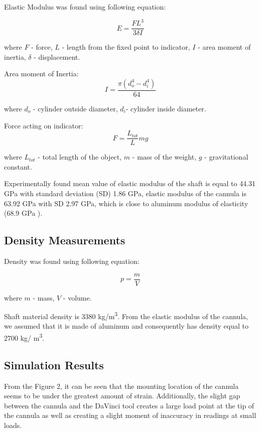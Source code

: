 Elastic Modulus was found using following equation:

\begin{equation}
E = \frac{FL^3}{3 \delta I} 
\end{equation}

where $F$ - force, $L$ - length from the fixed point to indicator, $I$ - area moment of inertia, $\delta$ - displacement.

Area moment of Inertia: 
\begin{equation}
I = \frac{\pi (d_o^4 - d_i^4)}{64}
\end{equation}

where $d_o$ - cylinder outside diameter, $d_i$- cylinder inside diameter.

Force acting on indicator:
\begin{equation}
F = \frac{L_{tot}}{L}mg
\end{equation}

where $L_{tot}$ - total length of the object, $m$ - mass of the weight, $g$ - gravitational constant.

Experimentally found mean value of elastic modulus of the shaft is equal to 44.31 GPa with standard deviation (SD) 1.86 GPa, elastic modulus of the cannula is 63.92 GPa with SD 2.97 GPa, which is close to aluminum modulus of elasticity (68.9 GPa \cite{youngs_modulus}).

	\subsection{Density Measurements}
	\label{sec:DenMeas}
Density was found using following equation:

\begin{equation}
p=\frac{m}{V}
\end{equation}

where $m$ - mass, $V$ - volume.

Shaft material density is 3380 kg/m\textsuperscript{3}. From the elastic modulus of the cannula, we assumed that it is made of aluminum and consequently has density equal to 2700 kg/ m\textsuperscript{3}.

\subsection{Simulation Results}
\label{sec:FEAres}
From the Figure 2, it can be seen that the mounting location of the cannula seems to be under the greatest amount of strain. Additionally, the slight gap between the cannula and the DaVinci tool creates a large load point at the tip of the cannula as well as creating a slight moment of inaccuracy in readings at small loads. 

